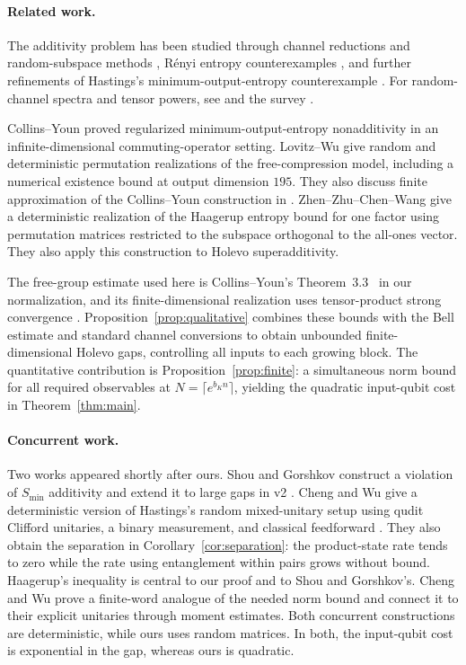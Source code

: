 \documentclass[11pt]{article}
\numberwithin{equation}{section}
\theoremstyle{boldremark}\newtheorem{remark}[theorem]{Remark}
\newcommand{\smin}{S_{\min}}
\begin{document}
\paragraph{Related work.}
The additivity problem has been studied through channel reductions and
random-subspace methods \cite{AHW,MSW,HLW}, R\'enyi entropy counterexamples
\cite{WH,ASW10,CHLMW,GHP,SS,DL}, and further refinements of Hastings's
minimum-output-entropy counterexample \cite{BH,NS}.
For random-channel spectra and tensor powers, see
\cite{CN,CNII,BCN12,CFN,FN14,Montanaro,FN15} and the survey \cite{CNSurvey}.

Collins--Youn \cite{CY} proved regularized minimum-output-entropy
nonadditivity in an infinite-dimensional commuting-operator setting.
Lovitz--Wu \cite{LW} give random and deterministic permutation
realizations of the free-compression model, including a numerical
existence bound at output dimension $195$. They also discuss finite
approximation of the Collins--Youn construction in \cite[Section~1.3]{LW}.
Zhen--Zhu--Chen--Wang \cite{ZZCW} give a deterministic realization of
the Haagerup entropy bound for one factor using permutation matrices
restricted to the subspace orthogonal to the all-ones vector. They
also apply this construction to Holevo superadditivity.

The free-group estimate used here is Collins--Youn's
Theorem~3.3~\cite{CY} in our normalization, and its finite-dimensional
realization uses tensor-product strong convergence
\cite[Theorem~9.2]{BC}. Proposition~\ref{prop:qualitative} combines
these bounds with the Bell estimate and standard channel conversions
\cite{FW,Shor} to obtain unbounded finite-dimensional Holevo gaps,
controlling all inputs to each growing block. The quantitative
contribution is Proposition~\ref{prop:finite}: a simultaneous norm
bound for all required observables at $N=\lceil e^{b_Kn}\rceil$,
yielding the quadratic input-qubit cost in Theorem~\ref{thm:main}.

\paragraph{Concurrent work.}
Two works appeared shortly after ours. Shou and Gorshkov
construct a violation of $\smin$ additivity and extend it to large
gaps in v2 \cite{SG26}. Cheng and Wu give a deterministic version of
Hastings's random mixed-unitary setup using qudit Clifford unitaries,
a binary measurement, and classical feedforward \cite{CW26}. They also obtain the separation in
Corollary~\ref{cor:separation}: the product-state rate tends to zero
while the rate using entanglement within pairs grows without bound.
Haagerup's inequality is central to our proof and to Shou and
Gorshkov's. Cheng and Wu prove a finite-word analogue of the needed
norm bound and connect it to their explicit unitaries through moment
estimates. Both concurrent constructions are deterministic, while
ours uses random matrices. In both, the input-qubit cost is
exponential in the gap, whereas ours is quadratic.
\end{document}
